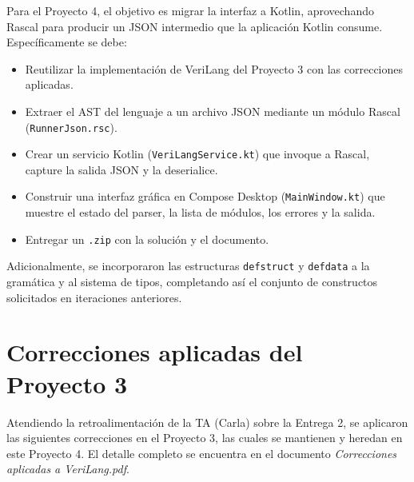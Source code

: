 \documentclass[12pt]{article}
\newcommand{\code}[1]{\texttt{#1}}
\begin{document}
Para el Proyecto 4, el objetivo es migrar la interfaz a Kotlin, aprovechando Rascal para
producir un JSON intermedio que la aplicación Kotlin consume. Específicamente se debe:

\begin{itemize}
  \item Reutilizar la implementación de VeriLang del Proyecto 3 con las correcciones
        aplicadas.
  \item Extraer el AST del lenguaje a un archivo JSON mediante un módulo Rascal
        (\code{RunnerJson.rsc}).
  \item Crear un servicio Kotlin (\code{VeriLangService.kt}) que invoque a Rascal,
        capture la salida JSON y la deserialice.
  \item Construir una interfaz gráfica en Compose Desktop (\code{MainWindow.kt}) que
        muestre el estado del parser, la lista de módulos, los errores y la salida.
  \item Entregar un \code{.zip} con la solución y el documento.
\end{itemize}

Adicionalmente, se incorporaron las estructuras \code{defstruct} y \code{defdata}
a la gramática y al sistema de tipos, completando así el conjunto de constructos
solicitados en iteraciones anteriores.

\section{Correcciones aplicadas del Proyecto 3}

Atendiendo la retroalimentación de la TA (Carla) sobre la Entrega 2, se aplicaron las
siguientes correcciones en el Proyecto 3, las cuales se mantienen y heredan en este
Proyecto 4. El detalle completo se encuentra en el documento
\emph{Correcciones aplicadas a VeriLang.pdf}.
\end{document}
